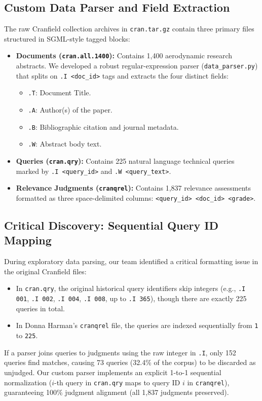\documentclass[11pt,a4paper]{article}
\begin{document}
\subsection{Custom Data Parser and Field Extraction}
The raw Cranfield collection archives in \texttt{cran.tar.gz} contain three primary files structured in SGML-style tagged blocks:
\begin{itemize}[leftmargin=*]
    \item \textbf{Documents (\texttt{cran.all.1400}):} Contains 1,400 aerodynamic research abstracts. We developed a robust regular-expression parser (\texttt{data\_parser.py}) that splits on \texttt{.I <doc\_id>} tags and extracts the four distinct fields:
    \begin{itemize}
        \item \texttt{.T}: Document Title.
        \item \texttt{.A}: Author(s) of the paper.
        \item \texttt{.B}: Bibliographic citation and journal metadata.
        \item \texttt{.W}: Abstract body text.
    \end{itemize}
    \item \textbf{Queries (\texttt{cran.qry}):} Contains 225 natural language technical queries marked by \texttt{.I <query\_id>} and \texttt{.W <query\_text>}.
    \item \textbf{Relevance Judgments (\texttt{cranqrel}):} Contains 1,837 relevance assessments formatted as three space-delimited columns: \texttt{<query\_id> <doc\_id> <grade>}.
\end{itemize}

\subsection{Critical Discovery: Sequential Query ID Mapping}
During exploratory data parsing, our team identified a critical formatting issue in the original Cranfield files:
\begin{itemize}[leftmargin=*]
    \item In \texttt{cran.qry}, the original historical query identifiers skip integers (e.g., \texttt{.I 001}, \texttt{.I 002}, \texttt{.I 004}, \texttt{.I 008}, up to \texttt{.I 365}), though there are exactly 225 queries in total.
    \item In Donna Harman's \texttt{cranqrel} file, the queries are indexed sequentially from \texttt{1} to \texttt{225}.
\end{itemize}
If a parser joins queries to judgments using the raw integer in \texttt{.I}, only 152 queries find matches, causing 73 queries (32.4\% of the corpus) to be discarded as unjudged. Our custom parser implements an explicit 1-to-1 sequential normalization ($i$-th query in \texttt{cran.qry} maps to query ID $i$ in \texttt{cranqrel}), guaranteeing 100\% judgment alignment (all 1,837 judgments preserved).
\end{document}
